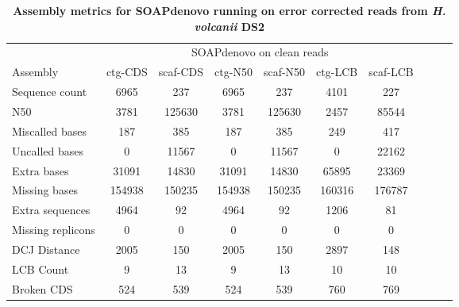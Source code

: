 \documentclass[10pt]{article}
\begin{document}
\clearpage

\begin{table}[hp] 
\caption{ 
\bf{Assembly metrics for SOAPdenovo running on error corrected reads from \textit{H. volcanii} DS2}}
\footnotesize
\begin{tabular}{l|cccccc|ccc}
&\multicolumn{6}{c|}{SOAPdenovo on clean reads} \\
Assembly           & ctg-CDS & scaf-CDS & ctg-N50 & scaf-N50 & ctg-LCB & scaf-LCB \\
Sequence count     & 6965    & 237      & 6965    & 237      & 4101    & 227      \\
N50                & 3781    & 125630   & 3781    & 125630   & 2457    & 85544   \\
Miscalled bases    & 187     & 385      & 187     & 385      & 249     & 417      \\
Uncalled bases     & 0       & 11567    & 0       & 11567    & 0       & 22162    \\
Extra bases        & 31091   & 14830    & 31091   & 14830    & 65895   & 23369    \\
Missing bases      & 154938  & 150235   & 154938  & 150235   & 160316  & 176787   \\
Extra sequences    & 4964    & 92       & 4964    & 92       & 1206    & 81       \\
Missing replicons  & 0       & 0        & 0       & 0        & 0       & 0        \\
DCJ Distance       & 2005    & 150      & 2005    & 150      & 2897    & 148      \\
LCB Count          & 9       & 13       & 9       & 13       & 10      & 10       \\
Broken CDS         & 524     & 539      & 524     & 539      & 760     & 769      \\
\end{tabular}
\label{tab:soapcleanvolc}
\end{table}
\end{document}

